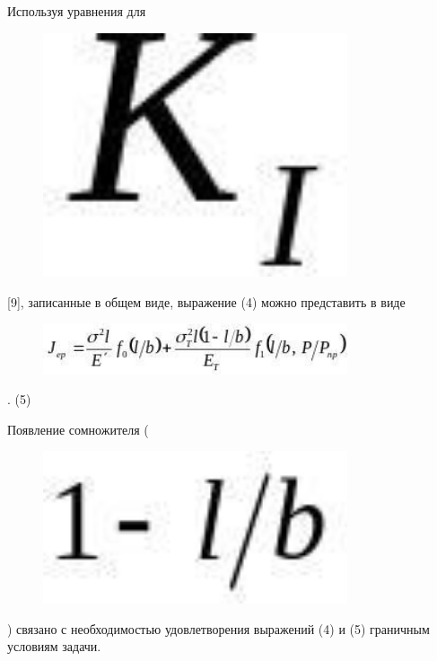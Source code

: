 Используя уравнения для \begin{figure}[H]
	\centering
	\includegraphics[width=0.8\textwidth]{assets/1173}
	\caption*{}
\end{figure}{[}9{]},
записанные в общем виде, выражение (4) можно представить в виде

\begin{figure}[H]
	\centering
	\includegraphics[width=0.8\textwidth]{assets/1174}
	\caption*{}
\end{figure}. (5)

Появление сомножителя (\begin{figure}[H]
	\centering
	\includegraphics[width=0.8\textwidth]{assets/1175}
	\caption*{}
\end{figure}) связано с
необходимостью удовлетворения выражений (4) и (5) граничным условиям
задачи.

